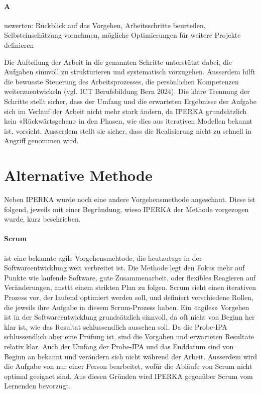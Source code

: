 \paragraph{A} uswerten: Rückblick auf das Vorgehen, Arbeitsschritte beurteilen, Selbsteinschätzung vornehmen, mögliche Optimierungen für weitere Projekte definieren

\newpage
Die Aufteilung der Arbeit in die genannten Schritte unterstützt dabei, die Aufgaben sinnvoll zu strukturieren und systematisch vorzugehen. Ausserdem hilft die bewusste Steuerung des Arbeitsprozesses, die persönlichen Kompetenzen weiterzuentwickeln (vgl. ICT Berufsbildung Bern 2024\parencite{ict}). Die klare Trennung der Schritte stellt sicher, dass der Umfang und die erwarteten Ergebnisse der Aufgabe sich im Verlauf der Arbeit nicht mehr stark ändern, da IPERKA grundsätzlich kein «Rückwärtsgehen» in den Phasen, wie dies aus iterativen Modellen bekannt ist, vorsieht. Ausserdem stellt sie sicher, dass die Realisierung nicht zu schnell in Angriff genommen wird.

\section{Alternative Methode}\label{sec:alternative-methode}
Neben IPERKA wurde noch eine andere Vorgehensmethode angeschaut. Diese ist folgend, jeweils mit einer Begründung, wieso IPERKA der Methode vorgezogen wurde, kurz beschrieben.

\paragraph{Scrum} ist eine bekannte agile Vorgehensmehtode, die heutzutage in der Softwareentwicklung weit verbreitet ist. Die Methode legt den Fokus mehr auf Punkte wie laufende Software, gute Zusammenarbeit, oder flexibles Reagieren auf Veränderungen, ansttt einem strikten Plan zu folgen. Scrum sieht einen iterativen Prozess vor, der laufend optimiert werden soll, und definiert verschiedene Rollen, die jeweils ihre Aufgabe in diesem Scrum-Prozess haben. Ein «agiles» Vorgehen ist in der Softwareentwicklung grundsätzlich sinnvoll, da oft nicht von Beginn her klar ist, wie das Resultat schlussendlich aussehen soll. Da die Probe-IPA schlussendlich aber eine Prüfung ist, sind die Vorgaben und erwarteten Resultate relativ klar. Auch der Umfang der Probe-IPA und das Enddatum sind von Beginn an bekannt und verändern sich nicht während der Arbeit. Ausserdem wird die Aufgabe von nur einer Person bearbeitet, wofür die Abläufe von Scrum nicht optimal geeignet sind. Aus diesen Gründen wird IPERKA gegenüber Scrum vom Lernenden bevorzugt.

